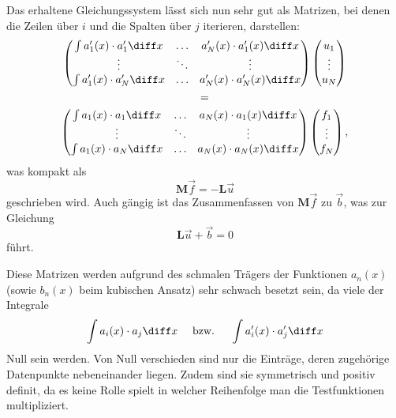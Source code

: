 Das erhaltene Gleichungssystem lässt sich nun sehr gut als Matrizen, bei denen die Zeilen über $i$ und die Spalten über $j$ iterieren, darstellen:
\begin{multline}
    \left(
        \begin{matrix}
            \int a'_1(x) \cdot a'_1 \diff x & \hdots & a'_N(x) \cdot a'_1(x) \diff x \\
            \vdots                          & \ddots & \vdots                        \\
            \int a'_1(x) \cdot a'_N \diff x & \hdots & a'_N(x) \cdot a'_N(x) \diff x \\
        \end{matrix}
    \right)
    \left(
        \begin{matrix}
            u_1 \\
            \vdots \\
            u_N
        \end{matrix}
    \right) \\
    = \\
    \left(
        \begin{matrix}
            \int a_1(x) \cdot a_1 \diff x & \hdots & a_N(x) \cdot a_1(x) \diff x \\
            \vdots                        & \ddots & \vdots                      \\
            \int a_1(x) \cdot a_N \diff x & \hdots & a_N(x) \cdot a_N(x) \diff x \\
        \end{matrix}
    \right)
    \left(
        \begin{matrix}
            f_1 \\
            \vdots \\
            f_N
        \end{matrix}
    \right),
\end{multline}
was kompakt als
\begin{equation}
    \mathbf{M}\vec{f} = -\mathbf{L}\vec{u}
\end{equation}
geschrieben wird.
Auch gängig ist das Zusammenfassen von $\mathbf{M}\vec{f}$ zu $\vec{b}$, was zur Gleichung
\begin{equation}
    \mathbf{L}\vec{u} + \vec{b} = 0
\end{equation}
führt.

Diese Matrizen werden aufgrund des schmalen Trägers der Funktionen $a_n(x)$ (sowie $b_n(x)$ beim kubischen Ansatz) sehr schwach besetzt sein, da viele der Integrale
\begin{equation}
    \int a_i(x) \cdot a_j \diff x \quad 
    \text{ bzw. } 
    \quad \int a'_i(x) \cdot a'_j \diff x 
\end{equation}
Null sein werden.
Von Null verschieden sind nur die Einträge, deren zugehörige Datenpunkte nebeneinander liegen.
Zudem sind sie symmetrisch und positiv definit, da es keine Rolle spielt in welcher Reihenfolge man die Testfunktionen multipliziert.

